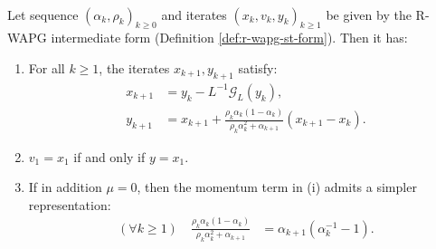 \documentclass[12pt]{article}
\begin{document}
        \begin{proposition}\label{prop:r-wapg-momentum-repr}
            \;\\
            Let sequence $(\alpha_k, \rho_k)_{k \ge 0}$ and iterates $(x_k, v_k, y_k)_{k\ge 1}$ be given by the R-WAPG intermediate form (Definition \ref{def:r-wapg-st-form}).
            Then it has:
            \begin{enumerate}
                \item For all $k \ge 1$, the iterates $x_{k + 1}, y_{k + 1}$ satisfy:
                \begin{align*}
                    x_{k + 1} &= y_k - L^{-1}\mathcal G_L (y_k),
                    \\
                    y_{k + 1} &=
                    x_{k + 1} +
                    \frac{\rho_k\alpha_k(1 - \alpha_k)}
                    {\rho_k\alpha_k^2 + \alpha_{k + 1}}(x_{k + 1} - x_k).
                \end{align*}
                \item $v_1 = x_1$ if and only if $y = x_1$.
                \item If in addition $\mu = 0$, then the momentum term in (i) admits a simpler representation:
                \begin{align*}
                    (\forall k \ge 1) \quad
                    \frac{\rho_k\alpha_k(1 - \alpha_k)}{\rho_k\alpha_k^2 + \alpha_{k + 1}}
                    & = \alpha_{k + 1}(\alpha_k^{-1} - 1).
                \end{align*}
            \end{enumerate}
        \end{proposition}
\end{document}
